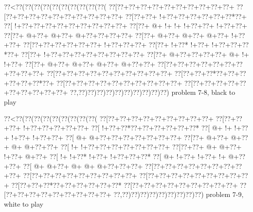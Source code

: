 \vbox{\vbox{\goo
\0??<\0??(\0??(\0??(\0??(\0??(\0??(\0??(\0??(\0??(\0??(
\0??[\0??+\0??+\0??+\0??+\0??+\0??+\0??+\0??+\0??+\0??+
\0??[\0??+\0??+\0??+\0??+\0??+\0??+\0??+\0??+\0??+\0??+
\0??[\0??+\0??+\- !+\0??+\0??+\0??+\0??+\0??+\0??*\0??+
\0??[\- !+\0??+\0??+\0??+\0??+\0??+\0??+\0??+\0??+\0??+
\0??[\0??+\- @+\- !+\- !+\- !+\0??+\0??+\- !+\0??+\0??+
\0??[\0??+\- @+\0??+\- @+\0??+\- @+\0??+\0??+\0??+\0??+
\0??[\0??+\- @+\0??+\- @+\0??+\- @+\0??+\- !+\0??+\0??+
\0??[\0??+\0??+\0??+\0??+\0??+\0??+\- !+\0??+\0??+\0??+
\0??[\0??+\- !+\0??*\- !+\0??+\- !+\0??+\0??+\0??*\0??+
\0??[\0??+\- !+\0??+\0??+\0??+\0??+\0??+\0??+\0??+\0??+
\0??[\0??+\- @+\0??+\0??+\0??+\0??+\- @+\- !+\- !+\0??+
\0??[\0??+\- @+\0??+\- @+\0??+\- @+\0??+\- @+\0??+\0??+
\0??[\0??+\0??+\0??+\0??+\0??+\0??+\0??+\0??+\0??+\0??+
\0??[\0??+\0??+\0??+\0??+\0??+\0??+\0??+\0??+\0??+\0??+
\0??[\0??+\0??+\0??*\0??+\0??+\0??+\0??+\0??+\0??*\0??+
\0??[\0??+\0??+\0??+\0??+\0??+\0??+\0??+\0??+\0??+\0??+
\0??[\0??+\0??+\0??+\0??+\0??+\0??+\0??+\0??+\0??+\0??+
\0??,\0??)\0??)\0??)\0??)\0??)\0??)\0??)\0??)\0??)\0??)
}
\hfil problem 7-8, black to play\hfil\break
}

\vbox{\vbox{\goo
\0??<\0??(\0??(\0??(\0??(\0??(\0??(\0??(\0??(\0??(
\0??[\0??+\0??+\0??+\0??+\0??+\0??+\0??+\0??+\0??+
\0??[\0??+\0??+\0??+\- !+\0??+\0??+\0??+\0??+\0??+
\0??[\- !+\0??+\0??*\0??+\0??+\0??+\0??+\0??+\0??*
\0??[\- @+\- !+\- !+\0??+\- !+\0??+\- !+\0??+\0??+
\0??[\- @+\- @+\0??+\0??+\0??+\0??+\0??+\0??+\0??+
\0??[\0??+\- @+\0??+\- @+\0??+\- @+\- @+\0??+\0??+
\0??[\- !+\- !+\0??+\0??+\0??+\0??+\0??+\0??+\0??+
\0??[\0??+\0??+\- @+\- @+\0??+\- !+\0??+\- @+\0??+
\0??[\- !+\- !+\0??*\- !+\0??+\- !+\0??+\0??+\0??*
\0??[\- @+\- !+\0??+\- !+\0??+\- !+\- @+\0??+\0??+
\0??[\- @+\- @+\0??+\- @+\- @+\- @+\0??+\0??+\0??+
\0??[\0??+\0??+\0??+\0??+\0??+\0??+\0??+\0??+\0??+
\0??[\0??+\0??+\0??+\0??+\0??+\0??+\0??+\0??+\0??+
\0??[\0??+\0??+\0??+\0??+\0??+\0??+\0??+\0??+\0??+
\0??[\0??+\0??+\0??*\0??+\0??+\0??+\0??+\0??+\0??*
\0??[\0??+\0??+\0??+\0??+\0??+\0??+\0??+\0??+\0??+
\0??[\0??+\0??+\0??+\0??+\0??+\0??+\0??+\0??+\0??+
\0??,\0??)\0??)\0??)\0??)\0??)\0??)\0??)\0??)\0??)
}
\hfil problem 7-9, white to play\hfil\break
}

